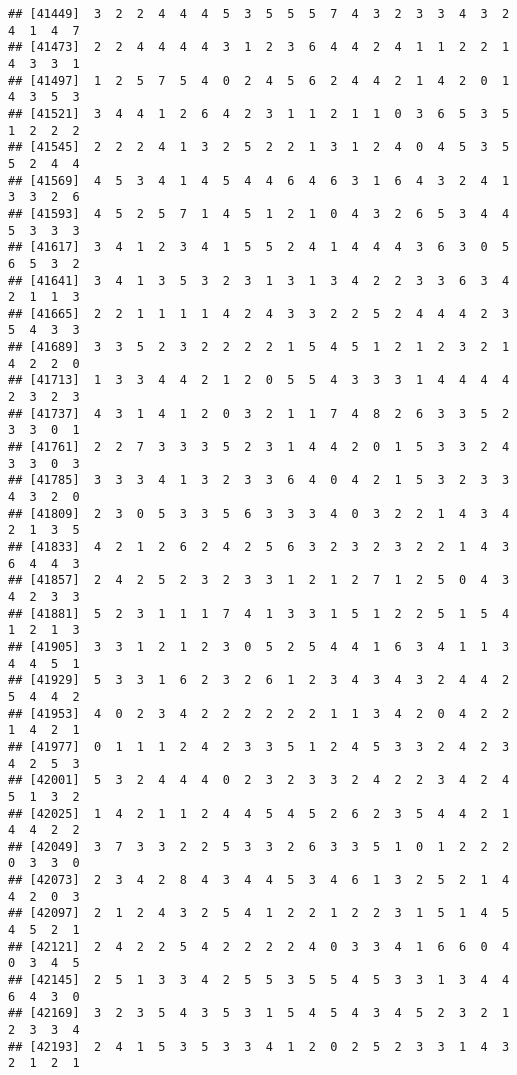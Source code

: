 \documentclass[
]{article}
\begin{document}
\begin{verbatim}
## [41449]  3  2  2  4  4  4  5  3  5  5  5  7  4  3  2  3  3  4  3  2  4  1  4  7
## [41473]  2  2  4  4  4  4  3  1  2  3  6  4  4  2  4  1  1  2  2  1  4  3  3  1
## [41497]  1  2  5  7  5  4  0  2  4  5  6  2  4  4  2  1  4  2  0  1  4  3  5  3
## [41521]  3  4  4  1  2  6  4  2  3  1  1  2  1  1  0  3  6  5  3  5  1  2  2  2
## [41545]  2  2  2  4  1  3  2  5  2  2  1  3  1  2  4  0  4  5  3  5  5  2  4  4
## [41569]  4  5  3  4  1  4  5  4  4  6  4  6  3  1  6  4  3  2  4  1  3  3  2  6
## [41593]  4  5  2  5  7  1  4  5  1  2  1  0  4  3  2  6  5  3  4  4  5  3  3  3
## [41617]  3  4  1  2  3  4  1  5  5  2  4  1  4  4  4  3  6  3  0  5  6  5  3  2
## [41641]  3  4  1  3  5  3  2  3  1  3  1  3  4  2  2  3  3  6  3  4  2  1  1  3
## [41665]  2  2  1  1  1  1  4  2  4  3  3  2  2  5  2  4  4  4  2  3  5  4  3  3
## [41689]  3  3  5  2  3  2  2  2  2  1  5  4  5  1  2  1  2  3  2  1  4  2  2  0
## [41713]  1  3  3  4  4  2  1  2  0  5  5  4  3  3  3  1  4  4  4  4  2  3  2  3
## [41737]  4  3  1  4  1  2  0  3  2  1  1  7  4  8  2  6  3  3  5  2  3  3  0  1
## [41761]  2  2  7  3  3  3  5  2  3  1  4  4  2  0  1  5  3  3  2  4  3  3  0  3
## [41785]  3  3  3  4  1  3  2  3  3  6  4  0  4  2  1  5  3  2  3  3  4  3  2  0
## [41809]  2  3  0  5  3  3  5  6  3  3  3  4  0  3  2  2  1  4  3  4  2  1  3  5
## [41833]  4  2  1  2  6  2  4  2  5  6  3  2  3  2  3  2  2  1  4  3  6  4  4  3
## [41857]  2  4  2  5  2  3  2  3  3  1  2  1  2  7  1  2  5  0  4  3  4  2  3  3
## [41881]  5  2  3  1  1  1  7  4  1  3  3  1  5  1  2  2  5  1  5  4  1  2  1  3
## [41905]  3  3  1  2  1  2  3  0  5  2  5  4  4  1  6  3  4  1  1  3  4  4  5  1
## [41929]  5  3  3  1  6  2  3  2  6  1  2  3  4  3  4  3  2  4  4  2  5  4  4  2
## [41953]  4  0  2  3  4  2  2  2  2  2  2  1  1  3  4  2  0  4  2  2  1  4  2  1
## [41977]  0  1  1  1  2  4  2  3  3  5  1  2  4  5  3  3  2  4  2  3  4  2  5  3
## [42001]  5  3  2  4  4  4  0  2  3  2  3  3  2  4  2  2  3  4  2  4  5  1  3  2
## [42025]  1  4  2  1  1  2  4  4  5  4  5  2  6  2  3  5  4  4  2  1  4  4  2  2
## [42049]  3  7  3  3  2  2  5  3  3  2  6  3  3  5  1  0  1  2  2  2  0  3  3  0
## [42073]  2  3  4  2  8  4  3  4  4  5  3  4  6  1  3  2  5  2  1  4  4  2  0  3
## [42097]  2  1  2  4  3  2  5  4  1  2  2  1  2  2  3  1  5  1  4  5  4  5  2  1
## [42121]  2  4  2  2  5  4  2  2  2  2  4  0  3  3  4  1  6  6  0  4  0  3  4  5
## [42145]  2  5  1  3  3  4  2  5  5  3  5  5  4  5  3  3  1  3  4  4  6  4  3  0
## [42169]  3  2  3  5  4  3  5  3  1  5  4  5  4  3  4  5  2  3  2  1  2  3  3  4
## [42193]  2  4  1  5  3  5  3  3  4  1  2  0  2  5  2  3  3  1  4  3  2  1  2  1

\end{verbatim}
\end{document}
